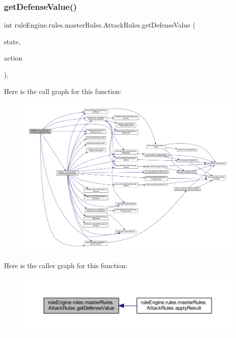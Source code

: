 \subsubsection{\texorpdfstring{get\+Defense\+Value()}{getDefenseValue()}}
{\footnotesize\ttfamily int rule\+Engine.\+rules.\+master\+Rules.\+Attack\+Rules.\+get\+Defense\+Value (\begin{DoxyParamCaption}\item[{\mbox{\hyperlink{classgame_1_1game_state_1_1_game_state}{Game\+State}}}]{state,  }\item[{\mbox{\hyperlink{classrule_engine_1_1_game_action}{Game\+Action}}}]{action }\end{DoxyParamCaption})\hspace{0.3cm}{\ttfamily [inline]}, {\ttfamily [private]}}

Here is the call graph for this function\+:
\nopagebreak
\begin{figure}[H]
\begin{center}
\leavevmode
\includegraphics[width=350pt]{classrule_engine_1_1rules_1_1master_rules_1_1_attack_rules_a80c89bcb3fe06834e0c1ef1772a8c71e_cgraph}
\end{center}
\end{figure}
Here is the caller graph for this function\+:
\nopagebreak
\begin{figure}[H]
\begin{center}
\leavevmode
\includegraphics[width=350pt]{classrule_engine_1_1rules_1_1master_rules_1_1_attack_rules_a80c89bcb3fe06834e0c1ef1772a8c71e_icgraph}
\end{center}
\end{figure}
